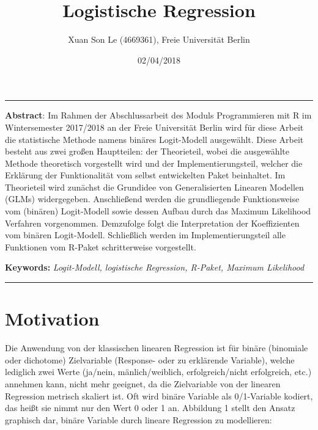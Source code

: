 \documentclass[12pt,]{article}
\title{\textbf{Logistische Regression}}
\author{Xuan Son Le (4669361), Freie Universität Berlin}
\date{02/04/2018}
\begin{document}
\maketitle

\begin{center}\rule{0.5\linewidth}{\linethickness}\end{center}

\textbf{Abstract}: Im Rahmen der Abschlussarbeit des Moduls
Programmieren mit R im Wintersemester 2017/2018 an der Freie Universität
Berlin wird für diese Arbeit die statistische Methode namens binäres
Logit-Modell ausgewählt. Diese Arbeit besteht aus zwei großen
Hauptteilen: der Theorieteil, wobei die ausgewählte Methode theoretisch
vorgestellt wird und der Implementierungsteil, welcher die Erklärung der
Funktionalität vom selbst entwickelten Paket beinhaltet. Im Theorieteil
wird zunächst die Grundidee von Generalisierten Linearen Modellen (GLMs)
widergegeben. Anschließend werden die grundliegende Funktionsweise vom
(binären) Logit-Modell sowie dessen Aufbau durch das Maximum Likelihood
Verfahren vorgenommen. Demzufolge folgt die Interpretation der
Koeffizienten vom binären Logit-Modell. Schließlich werden im
Implementierungsteil alle Funktionen vom R-Paket schritterweise
vorgestellt.

\textbf{Keywords:} \emph{Logit-Modell, logistische Regression, R-Paket,
Maximum Likelihood}

\begin{center}\rule{0.5\linewidth}{\linethickness}\end{center}

\newpage

\section{Motivation}\label{motivation}

Die Anwendung von der klassischen linearen Regression ist für binäre
(binomiale oder dichotome) Zielvariable (Response- oder zu erklärende
Variable), welche lediglich zwei Werte (ja/nein, mänlich/weiblich,
erfolgreich/nicht erfolgreich, etc.) annehmen kann, nicht mehr geeignet,
da die Zielvariable von der linearen Regression metrisch skaliert ist.
Oft wird binäre Variable als 0/1-Variable kodiert, das heißt sie nimmt
nur den Wert 0 oder 1 an. Abbildung 1 stellt den Ansatz graphisch dar,
binäre Variable durch lineare Regression zu modellieren:
\end{document}
